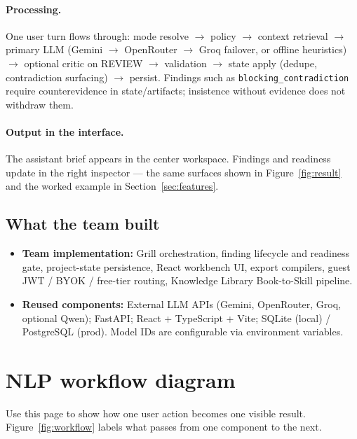 \documentclass[11pt,a4paper]{article}
\begin{document}
\paragraph{Processing.}
One user turn flows through: mode resolve \(\rightarrow\) policy \(\rightarrow\)
context retrieval \(\rightarrow\) primary LLM (Gemini \(\rightarrow\) OpenRouter \(\rightarrow\)
Groq failover, or offline heuristics) \(\rightarrow\) optional critic on REVIEW \(\rightarrow\)
validation \(\rightarrow\) state apply (dedupe, contradiction surfacing) \(\rightarrow\) persist.
Findings such as \texttt{blocking\_contradiction} require counterevidence in
state/artifacts; insistence without evidence does not withdraw them.

\paragraph{Output in the interface.}
The assistant brief appears in the center workspace. Findings and readiness
update in the right inspector --- the same surfaces shown in
Figure~\ref{fig:result} and the worked example in Section~\ref{sec:features}.

\subsection{What the team built}
\begin{itemize}
  \item \textbf{Team implementation:} Grill orchestration, finding lifecycle and readiness gate,
        project-state persistence, React workbench UI, export compilers, guest JWT / BYOK /
        free-tier routing, Knowledge Library Book-to-Skill pipeline.
  \item \textbf{Reused components:} External LLM APIs (Gemini, OpenRouter, Groq,
        optional Qwen); FastAPI; React + TypeScript + Vite; SQLite (local) /
        PostgreSQL (prod). Model IDs are configurable via environment variables.
\end{itemize}

\newpage

\section{NLP workflow diagram}
\label{sec:workflow}

Use this page to show how one user action becomes one visible result.
Figure~\ref{fig:workflow} labels what passes from one component to the next.
\end{document}
